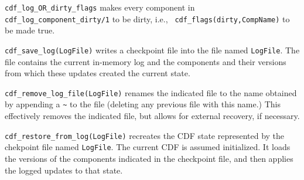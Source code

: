 \begin{description}
{\tt cdf\_log\_OR\_dirty\_flags} makes every component in {\tt
cdf\_log\_component\_dirty/1} to be dirty, i.e., {\tt
cdf\_flags(dirty,CompName)} to be made true.

{\tt cdf\_save\_log(LogFile)} writes a checkpoint file into the file
named {\tt LogFile}.  The file contains the current in-memory log and
the components and their versions from which these updates created the
current state.

{\tt cdf\_remove\_log\_file(LogFile)} renames the indicated file to the
name obtained by appending a \verb|~| to the file (deleting any
previous file with this name.)  This effectively removes the indicated
file, but allows for external recovery, if necessary.

{\tt cdf\_restore\_from\_log(LogFile)} recreates the CDF state represented
by the chekpoint file named {\tt LogFile}.  The current CDF is assumed
initialized.  It loads the versions of the components indicated in the
checkpoint file, and then applies the logged updates to that state.

\end{description}